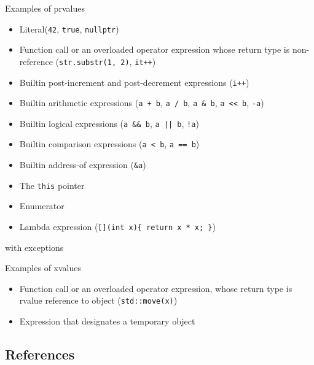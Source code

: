 \begin{frame}{Examples of prvalues}{}
  \begin{examples}
    \begin{itemize}
    \item
      Literal\manualfootnote (\lstinline!42!, \lstinline!true!, \lstinline!nullptr!)
    \item
      Function call or an overloaded operator expression whose return type is non-reference (\lstinline!str.substr(1, 2)!, \lstinline!it++!)
    \item
      Builtin post-increment and post-decrement expressions (\lstinline!i++!)
    \item
      Builtin arithmetic expressions (\lstinline!a + b!, \lstinline!a / b!, \lstinline!a & b!, \lstinline!a << b!, \lstinline!-a!)
    \item
      Builtin logical expressions (\lstinline!a && b!, \lstinline!a || b!, \lstinline|!a|)
    \item
      Builtin comparison expressions (\lstinline!a < b!, \lstinline!a == b!)
    \item
      Builtin address-of expression (\lstinline!&a!)
    \item
      The \lstinline!this! pointer
    \item
      Enumerator
    \item
      Lambda expression (\lstinline![](int x){ return x * x; }!)
    \end{itemize}

    \raggedleft
    \footnotesize
    \manualfootnote with exceptions
  \end{examples}
\end{frame}

\begin{frame}{Examples of xvalues}{}
  \begin{examples}
    \begin{itemize}
    \item
      Function call or an overloaded operator expression, whose return type is rvalue reference to object (\lstinline!std::move(x)!)
    \item
      Expression that designates a temporary object
    \end{itemize}
  \end{examples}
\end{frame}


\subsection{References}

